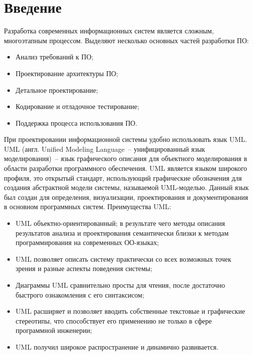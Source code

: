 ﻿\section{Введение}
  Разработка современных информационных систем является сложным, многоэтапным процессом. 
  Выделяют несколько основных частей разработки ПО:
  \begin{itemize}
		\item Анализ требований к ПО;
		\item Проектирование архитектуры ПО;
    \item Детальное проектирование;
    \item Кодирование и отладочное тестирование;
    \item Поддержка процесса использования ПО.
  \end{itemize} 
  При проектировании информационной системы удобно использовать язык UML.
  UML (англ. Unified Modeling Language~-- унифицированный язык моделирования)~-- язык графического описания для   
объектного моделирования в области разработки программного обеспечения. UML является языком широкого профиля, это 
открытый стандарт, использующий графические обозначения для создания абстрактной модели системы, называемой 
UML-моделью. Данный язык был создан для определения, визуализации, проектирования и документирования в основном программных систем.
  Преимущества UML:
  \begin{itemize}
    \item UML объектно-ориентированный; в результате чего методы описания результатов анализа и проектирования семантически близки к методам программирования на современных ОО-языках;
    \item UML позволяет описать систему практически со всех возможных точек зрения и разные аспекты поведения системы;
    \item Диаграммы UML сравнительно просты для чтения, после достаточно быстрого ознакомления с его синтаксисом;
    \item UML расширяет и позволяет вводить собственные текстовые и графические стереотипы, что способствует его применению не только в сфере программной инженерии;
    \item UML получил широкое распространение и динамично развивается.
  \end{itemize}
\newpage
\endinput


